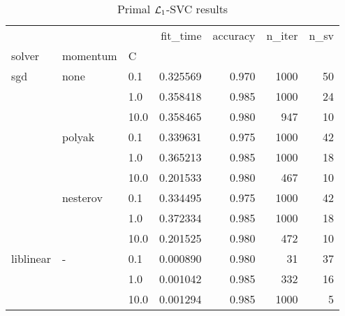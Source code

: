 \begin{table}[H]
\centering
\caption{Primal $\protect \mathcal{L}_1$-SVC results}
\label{primal_l1_svc_cv_results}
\begin{tabular}{lllrrrr}
\toprule
          &   &      &  fit\_time &  accuracy &  n\_iter &  n\_sv \\
solver & momentum & C &           &           &         &       \\
\midrule
sgd & none & 0.1  &  0.325569 &     0.970 &    1000 &    50 \\
          &   & 1.0  &  0.358418 &     0.985 &    1000 &    24 \\
          &   & 10.0 &  0.358465 &     0.980 &     947 &    10 \\
          & polyak & 0.1  &  0.339631 &     0.975 &    1000 &    42 \\
          &   & 1.0  &  0.365213 &     0.985 &    1000 &    18 \\
          &   & 10.0 &  0.201533 &     0.980 &     467 &    10 \\
          & nesterov & 0.1  &  0.334495 &     0.975 &    1000 &    42 \\
          &   & 1.0  &  0.372334 &     0.985 &    1000 &    18 \\
          &   & 10.0 &  0.201525 &     0.980 &     472 &    10 \\
liblinear & - & 0.1  &  0.000890 &     0.980 &      31 &    37 \\
          &   & 1.0  &  0.001042 &     0.985 &     332 &    16 \\
          &   & 10.0 &  0.001294 &     0.985 &    1000 &     5 \\
\bottomrule
\end{tabular}
\end{table}
